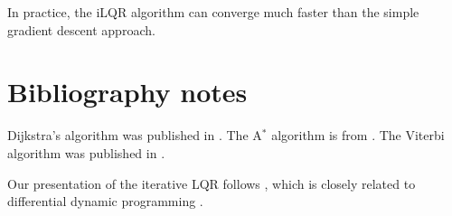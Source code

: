 In practice, the iLQR algorithm can converge much faster than the simple gradient descent approach.



% 
% 
% 

%


\section{Bibliography notes}

Dijkstra's algorithm was published in \cite{dijkstra1959note}. The A$^*$ algorithm is from \cite{hart1968formal}. The Viterbi algorithm was published in \cite{viterbi1967error}.

Our presentation of the iterative LQR follows \cite{todorov2005generalized}, which is closely related to differential dynamic programming \cite{JacobsonMayne1970}.

